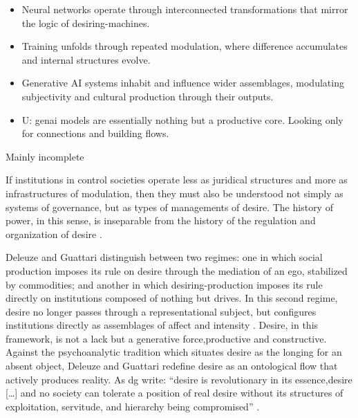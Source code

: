 \begin{orangebox}
	\begin{itemize}
		\item Neural networks operate through interconnected transformations that mirror the logic of desiring-machines.
		\item Training unfolds through repeated modulation, where difference accumulates and internal structures evolve.
		\item Generative AI systems inhabit and influence wider assemblages, modulating subjectivity and cultural production through their outputs.
		\item U: \gls{genai} models are essentially nothing but a productive core.
		      Looking only for connections and building flows.
	\end{itemize}
\end{orangebox}




\begin{orangebox}
	Mainly incomplete
\end{orangebox}





If institutions in control societies operate less as juridical structures and more as infrastructures of modulation, then they must also be understood not simply as systems of governance, but as types of managements of desire. The history of power, in this sense, is inseparable from the history of the regulation and organization of desire \parencite[139-145]{deleuze1983} .

Deleuze and Guattari distinguish between two regimes: one in which social production imposes its rule on desire through the mediation of an ego, stabilized by commodities; and another in which desiring-production imposes its rule directly on institutions composed of nothing but drives. In this second regime, desire no longer passes through a representational subject, but configures institutions directly as assemblages of affect and intensity \parencite[63]{deleuze1983}. Desire, in this framework, is not a lack but a generative force,productive and constructive. Against the psychoanalytic tradition which situates desire as the longing for an absent object, Deleuze and Guattari redefine desire as an ontological flow that actively produces reality. As \gls{dg} write: ``desire is revolutionary in its essence,desire [\ldots] and no society can tolerate a position of real desire without its structures of exploitation, servitude, and hierarchy being compromised'' \parencite[116]{deleuze1983}.

